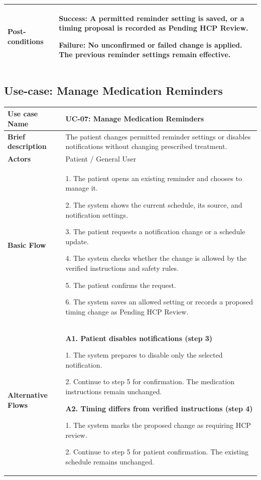 \begin{longtable}{|p{}|p{}|}
\textbf{Post-conditions} &
\textbf{Success:} A permitted reminder setting
is saved, or a timing proposal is recorded
as Pending HCP Review.\par
\textbf{Failure:} No unconfirmed or failed change
is applied. The previous reminder settings
remain effective.
\\ \hline

\end{longtable}

\subsection{Use-case: Manage Medication Reminders}
\label{uc:uc-07}
\begin{longtable}{|p{}|p{}|}
\hline
\textbf{Use case Name} & UC-07: Manage Medication Reminders \\ \hline
\textbf{Brief description} & The patient changes permitted reminder settings or disables notifications without changing prescribed treatment. \\ \hline
\textbf{Actors} & Patient / General User \\ \hline
\textbf{Basic Flow} &
1. The patient opens an existing reminder and chooses to manage it.\par
2. The system shows the current schedule, its source, and notification settings.\par
3. The patient requests a notification change or a schedule update.\par
4. The system checks whether the change is allowed by the verified instructions and safety rules.\par
5. The patient confirms the request.\par
6. The system saves an allowed setting or records a proposed timing change as Pending HCP Review.
\\ \hline
\textbf{Alternative Flows} &
\textbf{A1. Patient disables notifications (step 3)}\par
1. The system prepares to disable
only the selected notification.\par
2. Continue to step 5 for confirmation.
The medication instructions remain unchanged.
\par\smallskip

\textbf{A2. Timing differs from verified
instructions (step 4)}\par
1. The system marks the proposed
change as requiring HCP review.\par
2. Continue to step 5 for patient
confirmation. The existing schedule
remains unchanged.


\end{longtable}
